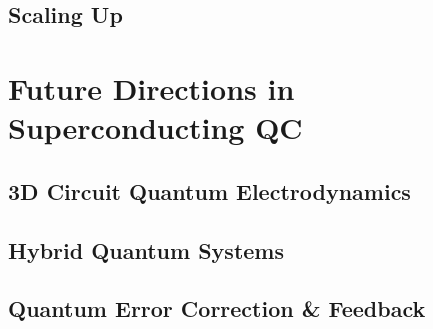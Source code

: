 \subsection{Scaling Up}

\section{Future Directions in Superconducting QC}


\subsection{3D Circuit Quantum Electrodynamics}


\subsection{Hybrid Quantum Systems}


\subsection{Quantum Error Correction \& Feedback}

